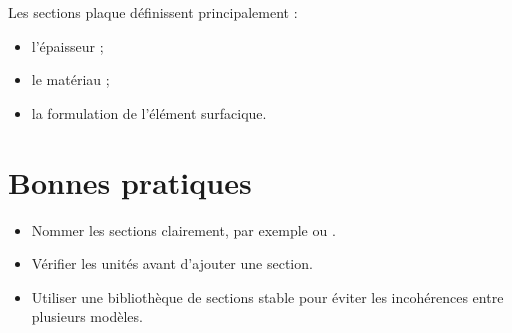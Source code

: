 Les sections plaque définissent principalement :

\begin{itemize}
  \item l'épaisseur ;
  \item le matériau ;
  \item la formulation de l'élément surfacique.
\end{itemize}

\section{Bonnes pratiques}

\begin{itemize}
  \item Nommer les sections clairement, par exemple 
  ou .
  \item Vérifier les unités avant d'ajouter une section.
  \item Utiliser une bibliothèque de sections stable pour éviter les incohérences
  entre plusieurs modèles.
\end{itemize}
